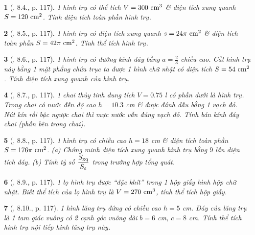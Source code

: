 \documentclass{article}
\newtheorem{baitoan}{}
\begin{document}
\begin{baitoan}[\cite{Binh_boi_duong_Toan_9_tap_2}, 8.4., p. 117]
	1 hình trụ có thể tích $V = 300\ {\rm cm}^3$ \& diện tích xung quanh $S = 120\ {\rm cm}^2$. Tính diện tích toàn phần hình trụ.
\end{baitoan}

\begin{baitoan}[\cite{Binh_boi_duong_Toan_9_tap_2}, 8.5., p. 117]
	1 hình trụ có diện tích xung quanh $s = 24\pi\ {\rm cm}^2$ \& diện tích toàn phần $S = 42\pi\ {\rm cm}^2$. Tính thể tích hình trụ.
\end{baitoan}

\begin{baitoan}[\cite{Binh_boi_duong_Toan_9_tap_2}, 8.6., p. 117]
	1 hình trụ có đường kính đáy bằng $a = \frac{2}{3}$ chiều cao. Cắt hình trụ này bằng 1 mặt phẳng chứa trục ta được 1 hình chữ nhật có diện tích $S = 54\ {\rm cm}^2$. Tính diện tích xung quanh của hình trụ.
\end{baitoan}

\begin{baitoan}[\cite{Binh_boi_duong_Toan_9_tap_2}, 8.7., p. 117]
	1 chai thủy tinh dung tích $V = 0.75$ {\rm l} có phần dưới là hình trụ. Trong chai có nước đến độ cao $h = 10.3$ {\rm cm} \& được đánh dấu bằng 1 vạch đỏ. Nút kín rồi bậc ngược chai thì mực nước vẫn đúng vạch đỏ. Tính bán kính đáy chai (phần bên trong chai).
\end{baitoan}

\begin{baitoan}[\cite{Binh_boi_duong_Toan_9_tap_2}, 8.8., p. 117]
	1 hình trụ có chiều cao $h = 18$ {\rm cm} \& diện tích toàn phần $S = 176\pi\ {\rm cm}^2$. (a) Chứng minh diện tích xung quanh hình trụ bằng $9$ lần diện tích đáy. (b) Tính tỷ số $\dfrac{S_{\rm xq}}{S_{\tiny\mbox{\rm đ}}}$ trong trường hợp tổng quát.
\end{baitoan}

\begin{baitoan}[\cite{Binh_boi_duong_Toan_9_tap_2}, 8.9., p. 117]
	1 lọ hình trụ được ``đặc khít'' trong 1 hộp giấy hình hộp chữ nhật. Biết thể tích của lọ hình trụ là $V = 270\ {\rm cm}^3$, tính thể tích hộp giấy.
\end{baitoan}

\begin{baitoan}[\cite{Binh_boi_duong_Toan_9_tap_2}, 8.10., p. 117]
	1 hình lăng trụ đứng có chiều cao $h = 5$ {\rm cm}. Đáy của lăng trụ là 1 tam giác vuông có 2 cạnh góc vuông dài $b = 6$ {\rm cm}, $c = 8$ {\rm cm}. Tính thể tích hình trụ nội tiếp hình lăng trụ này.
\end{baitoan}
\end{document}
